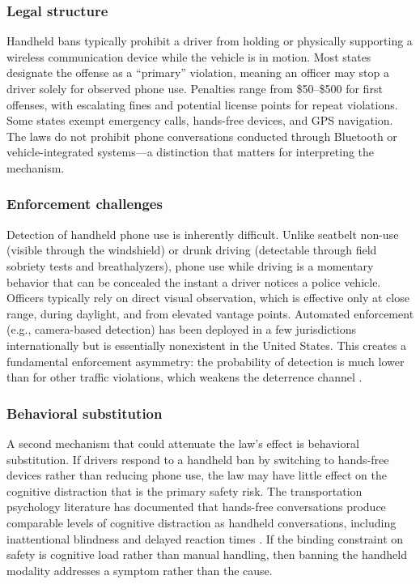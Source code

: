\documentclass[12pt]{article}
\begin{document}
\subsubsection*{Legal structure} Handheld bans typically prohibit a driver from holding or physically supporting a wireless communication device while the vehicle is in motion. Most states designate the offense as a ``primary'' violation, meaning an officer may stop a driver solely for observed phone use. Penalties range from \$50--\$500 for first offenses, with escalating fines and potential license points for repeat violations. Some states exempt emergency calls, hands-free devices, and GPS navigation. The laws do not prohibit phone conversations conducted through Bluetooth or vehicle-integrated systems---a distinction that matters for interpreting the mechanism.

\subsubsection*{Enforcement challenges} Detection of handheld phone use is inherently difficult. Unlike seatbelt non-use (visible through the windshield) or drunk driving (detectable through field sobriety tests and breathalyzers), phone use while driving is a momentary behavior that can be concealed the instant a driver notices a police vehicle. Officers typically rely on direct visual observation, which is effective only at close range, during daylight, and from elevated vantage points. Automated enforcement (e.g., camera-based detection) has been deployed in a few jurisdictions internationally but is essentially nonexistent in the United States. This creates a fundamental enforcement asymmetry: the probability of detection is much lower than for other traffic violations, which weakens the deterrence channel \citep{Becker1968}.

\subsubsection*{Behavioral substitution} A second mechanism that could attenuate the law's effect is behavioral substitution. If drivers respond to a handheld ban by switching to hands-free devices rather than reducing phone use, the law may have little effect on the cognitive distraction that is the primary safety risk. The transportation psychology literature has documented that hands-free conversations produce comparable levels of cognitive distraction as handheld conversations, including inattentional blindness and delayed reaction times \citep{Strayer2006, Caird2008}. If the binding constraint on safety is cognitive load rather than manual handling, then banning the handheld modality addresses a symptom rather than the cause.
\end{document}
